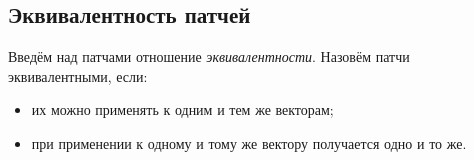 \subsection{Эквивалентность патчей}

Введём над патчами отношение \emph{эквивалентности}. Назовём патчи
эквивалентными, если:

\begin{itemize}
\item их можно применять к одним и тем же векторам;
\item при применении к одному и тому же вектору получается одно и то же.
\end{itemize}

\begin{code}%
\>[0]\<[2]%
\>[2] \AgdaSymbol{:}  \AgdaSymbol{\{}\AgdaSymbol{\}\{}  \AgdaSymbol{:}  \AgdaSymbol{\}}\<%
\\
\>[2]\<[4]%
\>[4] \AgdaSymbol{(} \AgdaSymbol{:}  \AgdaSymbol{)}  \AgdaSymbol{(} \AgdaSymbol{:}  \AgdaSymbol{)}  \<%
\\
\>[0]\<[2]%
\>[2] \AgdaSymbol{\{}\AgdaSymbol{\}}   \AgdaSymbol{=}  \AgdaSymbol{(} \AgdaSymbol{:}   \AgdaSymbol{)} \<[34]%
\>[34]\<%
\\
\>[2]\<[4]%
\>[4] \AgdaSymbol{(} \AgdaSymbol{:}   \AgdaSymbol{)}   \AgdaSymbol{(}  \AgdaSymbol{)}    \<[45]%
\>[45]\<%
\\
\>[4]\<[6]%
\>[6]\AgdaSymbol{(}        \AgdaSymbol{))}\<%
\end{code}
      
\begin{code}%
\>[0]\<[2]%
\>[2] \AgdaSymbol{:}  \AgdaSymbol{\{}\AgdaSymbol{\}\{}  \AgdaSymbol{:}  \AgdaSymbol{\}}\<%
\\
\>[2]\<[4]%
\>[4] \AgdaSymbol{(} \AgdaSymbol{:}  \AgdaSymbol{)}  \AgdaSymbol{(} \AgdaSymbol{:}  \AgdaSymbol{)}  \<%
\\
\>[0]\<[2]%
\>[2]   \AgdaSymbol{=} \AgdaSymbol{(}  \AgdaSymbol{)}  \AgdaSymbol{(}  \AgdaSymbol{)}\<%
\end{code}

